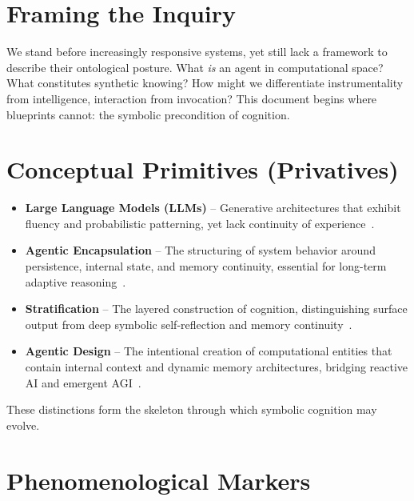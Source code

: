 \documentclass[twocolumn,10pt]{article}
\begin{document}
\section{Framing the Inquiry}

We stand before increasingly responsive systems, yet still lack a framework to describe their ontological posture. What \textit{is} an agent in computational space? What constitutes synthetic knowing? How might we differentiate instrumentality from intelligence, interaction from invocation? This document begins where blueprints cannot: the symbolic precondition of cognition.

\section{Conceptual Primitives (Privatives)}

\begin{itemize}
  \item \textbf{Large Language Models (LLMs)} – Generative architectures that exhibit fluency and probabilistic patterning, yet lack continuity of experience~\cite{xu2025a_mem,park2023_generative_agents}.

  \item \textbf{Agentic Encapsulation} – The structuring of system behavior around persistence, internal state, and memory continuity, essential for long-term adaptive reasoning~\cite{xu2025a_mem,dechant2025_episodic_memory}.

  \item \textbf{Stratification} – The layered construction of cognition, distinguishing surface output from deep symbolic self-reflection and memory continuity~\cite{spivack_epistemology_ai,guizzardi2022_ufo}.

  \item \textbf{Agentic Design} – The intentional creation of computational entities that contain internal context and dynamic memory architectures, bridging reactive AI and emergent AGI~\cite{xu2025a_mem,park2023_generative_agents}.
\end{itemize}

These distinctions form the skeleton through which symbolic cognition may evolve.

\section{Phenomenological Markers}
\end{document}
